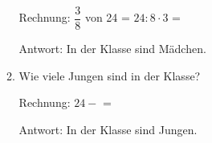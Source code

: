 \begin{enumerate}[resume, label=\arabic*.]
\begin{enumerate}[label=\alph*)]
        \vspace{0.3cm}
        Rechnung: $\dfrac{3}{8}$ von 24 = $24 : 8 \cdot 3$ = \underline{\hspace{5cm}}

        \vspace{0.3cm}
        Antwort: In der Klasse sind \underline{\hspace{3cm}} Mädchen.

        \vspace{0.5cm}
        \item Wie viele Jungen sind in der Klasse?

        \vspace{0.3cm}
        Rechnung: $24 -$ \underline{\hspace{2cm}} = \underline{\hspace{3cm}}

        \vspace{0.3cm}
        Antwort: In der Klasse sind \underline{\hspace{3cm}} Jungen.
    \end{enumerate}
\end{enumerate}
